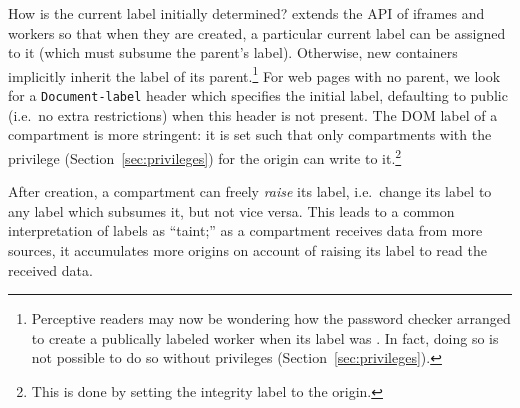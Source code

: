 %

How is the current label initially determined?
%
\sys{} extends the API of iframes and workers so that when they are
created, a particular current label can be assigned to it (which
must subsume the parent's label).  Otherwise, new containers implicitly
inherit the label of its parent.\footnote{Perceptive readers may now be wondering how
the password checker arranged to create a publically labeled worker
when its label was .  In fact, doing so is not possible
to do so without privileges (Section~\ref{sec:privileges}).}
%
For web pages with no parent, we look for a {\tt Document-label} header which
specifies the initial label, defaulting to public (i.e.\ no extra
restrictions) when this header is not present.
%
The DOM label of a compartment is more stringent: it is set such that
only compartments with the privilege (Section~\ref{sec:privileges}) for the origin can write to
it.\footnote{This is done by setting the integrity label to the origin.}

After creation, a compartment can freely \emph{raise} its label, i.e.\
change its label to any label which subsumes it, but not vice versa.
%
This leads to a common interpretation of labels as ``taint;'' as
a compartment receives data from more sources, it accumulates more
origins on account of raising its label to read the received data.

